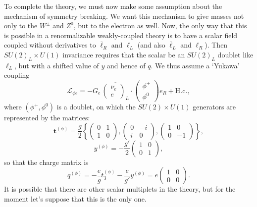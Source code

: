 To complete the theory, we must now make some assumption about the mechanism of symmetry breaking. We want this mechanism to give masses not only to the $W^\pm$ and $Z^0$, but to the electron as well. Now, the only way that this is possible in a renormalizable weakly-coupled theory is to have a scalar field coupled without derivatives to $\bar\ell_R$ and $\ell_L$ (and also $\bar\ell_L$ and $\ell_R$). Then $SU(2)_L\times U(1)$ invariance requires that the scalar be an $SU(2)_L$ doublet like $\ell_L$, but with a shifted value of $y$ and hence of $q$. We thus assume a `Yukawa' coupling
\begin{equation}
\mathcal{L}_{\phi e}
=-G_e\,
\overline{\begin{pmatrix}\nu_e\\e\end{pmatrix}_{\!L}}
\cdot
\begin{pmatrix}\phi^+\\\phi^0\end{pmatrix}
e_R+\mathrm{H.c.},
\tag{21.3.21}\label{eq:21.3.21}
\end{equation}
where $(\phi^+,\phi^0)$ is a doublet, on which the $SU(2)\times U(1)$ generators are represented by the matrices:
\begin{equation}
\mathbf{t}^{(\phi)}
=\frac{g}{2}
\left\{
\begin{pmatrix}0&1\\1&0\end{pmatrix},
\begin{pmatrix}0&-i\\i&0\end{pmatrix},
\begin{pmatrix}1&0\\0&-1\end{pmatrix}
\right\},
\tag{21.3.22}\label{eq:21.3.22}
\end{equation}
\begin{equation}
y^{(\phi)}=-\frac{g'}{2}
\begin{pmatrix}1&0\\0&1\end{pmatrix},
\tag{21.3.23}\label{eq:21.3.23}
\end{equation}
so that the charge matrix is
\begin{equation}
q^{(\phi)}
=-\frac{e}{g}t_3^{(\phi)}-\frac{e}{g'}y^{(\phi)}
=e\begin{pmatrix}1&0\\0&0\end{pmatrix}.
\tag{21.3.24}\label{eq:21.3.24}
\end{equation}
It is possible that there are other scalar multiplets in the theory, but for the moment let's suppose that this is the only one.

